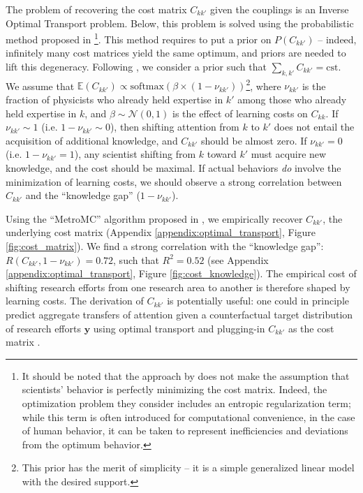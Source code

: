 \documentclass{article}
\begin{document}
The problem of recovering the cost matrix $C_{kk'}$ given the couplings is an Inverse Optimal Transport problem. Below, this problem is solved using the probabilistic method proposed in \citealt{pmlr-v162-chiu22b}\footnote{It should be noted that the approach by \citet{pmlr-v162-chiu22b} does not make the assumption that scientists' behavior is perfectly minimizing the cost matrix. Indeed, the optimization problem they consider includes an entropic regularization term; while this term is often introduced for computational convenience, in the case of human behavior, it can be taken to represent inefficiencies and deviations from the optimum behavior.}. %
This method requires to put a prior on $P(C_{kk'})$ -- indeed, infinitely many cost matrices yield the same optimum, and priors are needed to lift this degeneracy. Following \citealt{pmlr-v162-chiu22b}, we consider a prior such that $\sum_{k,k'}C_{kk'}=\mathrm{cst}$. We assume that $\mathbb{E}(C_{kk'})\propto \mathrm{softmax}(\beta \times (1-\nu_{kk'}))$\footnote{This prior has the merit of simplicity -- it is a simple generalized linear model with the desired support.}, where $\nu_{kk'}$ is the fraction of physicists who already held expertise in $k'$ among those who already held expertise in $k$, and $\beta\sim\mathcal{N}(0,1)$ is the effect of learning costs on $C_{kk
}$. If $\nu_{kk'}\sim 1$ (i.e. $1-\nu_{kk'}\sim 0$), then shifting attention from $k$ to $k'$ does not entail the acquisition of additional knowledge, and $C_{kk'}$ should be almost zero. If $\nu_{kk'}=0$ (i.e. $1-\nu_{kk'}= 1$), any scientist shifting from $k$ toward $k'$ must acquire new knowledge, and the cost should be maximal. If actual behaviors \textit{do} involve the minimization of learning costs, we should observe a strong correlation between $C_{kk'}$ and the ``knowledge gap'' ($1-\nu_{kk'}$).

Using the ``MetroMC'' algorithm proposed in \citealt{pmlr-v162-chiu22b}, we empirically recover $C_{kk'}$, the underlying cost matrix (Appendix \ref{appendix:optimal_transport}, Figure \ref{fig:cost_matrix}). We find a strong correlation with the ``knowledge gap'': $R(C_{kk'},1-\nu_{kk'})=0.72$, such that $R^2=0.52$ (see Appendix \ref{appendix:optimal_transport}, Figure \ref{fig:cost_knowledge}). The empirical cost of shifting research efforts from one research area to another is therefore shaped by learning costs. The derivation of $C_{kk'}$ is potentially useful: one could in principle predict aggregate transfers of attention given a counterfactual target distribution of research efforts $\bm{y}$ using optimal transport and plugging-in $C_{kk'}$ as the cost matrix \citep{li2019learning}. 
\end{document}
